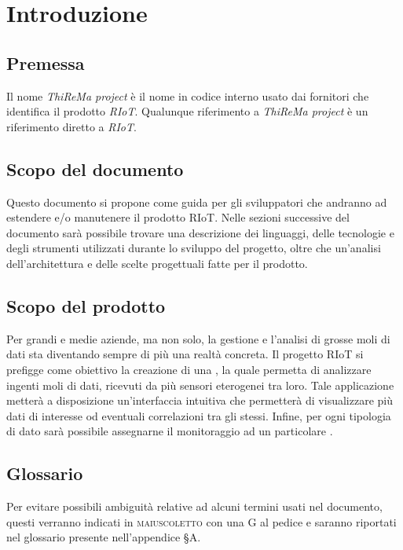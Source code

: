 \section{Introduzione}
	\subsection{Premessa}
		Il nome \textit{ThiReMa project} è il nome in codice interno usato dai fornitori che identifica il prodotto \textit{RIoT}. Qualunque riferimento a \textit{ThiReMa project} è un riferimento diretto a \textit{RIoT}. 
	\subsection{Scopo del documento}
		Questo documento si propone come guida per gli sviluppatori che andranno ad estendere e/o manutenere il prodotto RIoT. 
		\newline
		Nelle sezioni successive del documento sarà possibile trovare una descrizione dei linguaggi, delle tecnologie e degli strumenti utilizzati durante lo sviluppo del progetto, oltre che un'analisi dell'architettura e delle scelte progettuali fatte per il prodotto.
	\subsection{Scopo del prodotto}
	 	Per grandi e medie aziende, ma non solo, la gestione e l'analisi di grosse moli di dati sta diventando sempre di più una realtà concreta.
	 	\newline
		Il progetto RIoT si prefigge come obiettivo la creazione di una , la quale permetta di analizzare ingenti moli di dati, ricevuti da più sensori eterogenei tra loro. Tale applicazione metterà a disposizione un'interfaccia intuitiva che permetterà di visualizzare più dati di interesse od eventuali correlazioni tra gli stessi. Infine, per ogni tipologia di dato sarà possibile assegnarne il monitoraggio ad un particolare .	
	\subsection{Glossario}
		Per evitare possibili ambiguità relative ad alcuni termini usati nel documento, questi verranno indicati in \textsc{maiuscoletto} con una G al pedice e saranno riportati nel glossario presente nell'appendice \S A.